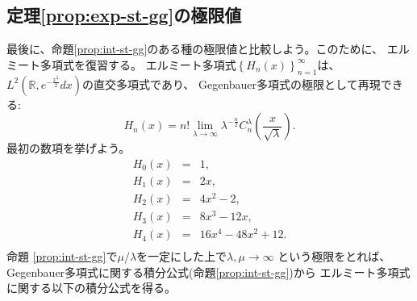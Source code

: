\subsection{定理\ref{prop:exp-st-gg}の極限値}
最後に、命題\ref{prop:int-st-gg}のある種の極限値と比較しよう。このために、
エルミート多項式を復習する。
エルミート多項式$\left\{ H_n(x) \right\}_{n=1}^\infty$は、
	$L^2\left( \mathbb{R},e^{-\frac{x^2}{2}}dx \right)$の直交多項式であり、
	Gegenbauer多項式の極限として再現できる:
	\begin{equation*}
			H_n (x) = n! \lim_{\lambda \rightarrow \infty} \lambda^{- \frac{n}{2}}
			C_n^{\lambda} \left( \frac{x}{\sqrt{\lambda}} \right).
	\end{equation*}
	最初の数項を挙げよう。
		\begin{eqnarray*}
		H_0(x)&=& 1,\\
		H_1(x)&=& 2x,\\
		H_2(x)&=& 
		4x^2-2,\\
		H_3(x)&=& 8x^3-12x,\\
		H_4(x)&=& 16x^4-48x^2+12.\\
		\end{eqnarray*}
	命題 \ref{prop:int-st-gg}で$\mu/\lambda$を一定にした上で$\lambda,\mu\to\infty$ 
	という極限をとれば、Gegenbauer多項式に関する積分公式(命題\ref{prop:int-st-gg})から
	エルミート多項式に関する以下の積分公式を得る。
